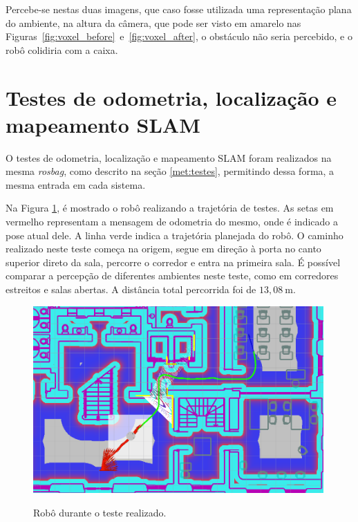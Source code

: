 \documentclass[repeatfields,xlists,xpacks,oneside,yearsonly]{ufrgscca}
\begin{document}
Percebe-se nestas duas imagens, que caso fosse utilizada uma
representação plana do ambiente, na altura da câmera, que pode ser
visto em amarelo nas
Figuras~\ref{fig:voxel_before}~e~\ref{fig:voxel_after}, o obstáculo
não seria percebido, e o robô colidiria com a caixa.

\section{Testes de odometria, localização e mapeamento SLAM}

O testes de odometria, localização e mapeamento SLAM foram realizados
na mesma \textit{rosbag}, como descrito na seção \ref{met:testes},
permitindo dessa forma, a mesma entrada em cada sistema.

Na Figura \ref{fig:base_bag}, é mostrado o robô realizando a
trajetória de testes. As setas em vermelho representam a mensagem de
odometria do mesmo, onde é indicado a pose atual dele. A linha verde
indica a trajetória planejada do robô. O caminho realizado neste
teste começa na origem, segue em direção à porta no canto superior
direto da sala, percorre o corredor e entra na primeira sala. É
possível comparar a percepção de diferentes ambientes neste teste,
como em corredores estreitos e salas abertas. A distância total
percorrida foi de $13,08~\si{\meter}$.

\begin{figure}[h]
    {
        \centering
        \caption{Robô durante o teste realizado.}
        \label{fig:base_bag}
        \includegraphics[width=0.99\textwidth]{base_bag_sim_zoom.png}\\
    }
\end{figure}
\end{document}
